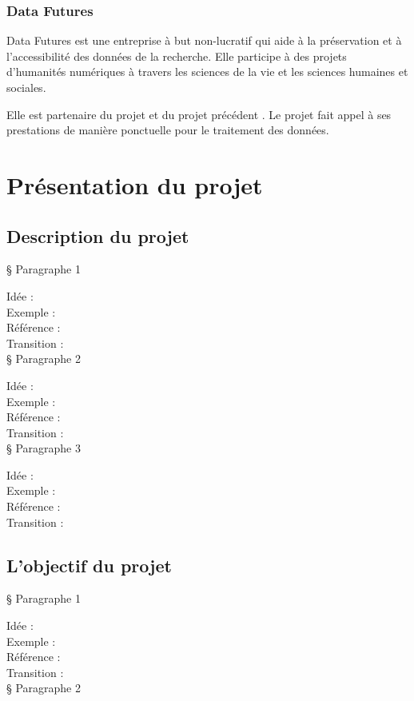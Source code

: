 \subsubsection{Data Futures}
Data Futures est une entreprise à but non-lucratif qui aide à la préservation et à l'accessibilité des données de la recherche. Elle participe à des projets d'humanités numériques à travers les sciences de la vie et les sciences humaines et sociales.

Elle est partenaire du projet \COREL et du projet précédent \EPJ. Le projet fait appel à ses prestations de manière ponctuelle pour le traitement des données.

\section{Présentation du projet \COREL}
\subsection{Description du projet}

§ Paragraphe 1

Idée :\\
Exemple :\\
Référence :\\
Transition :\\

§ Paragraphe 2

Idée :\\
Exemple :\\
Référence :\\
Transition :\\

§ Paragraphe 3

Idée :\\
Exemple :\\
Référence :\\
Transition :\\

\subsection{L’objectif du projet}

§ Paragraphe 1

Idée :\\
Exemple :\\
Référence :\\
Transition :\\

§ Paragraphe 2

